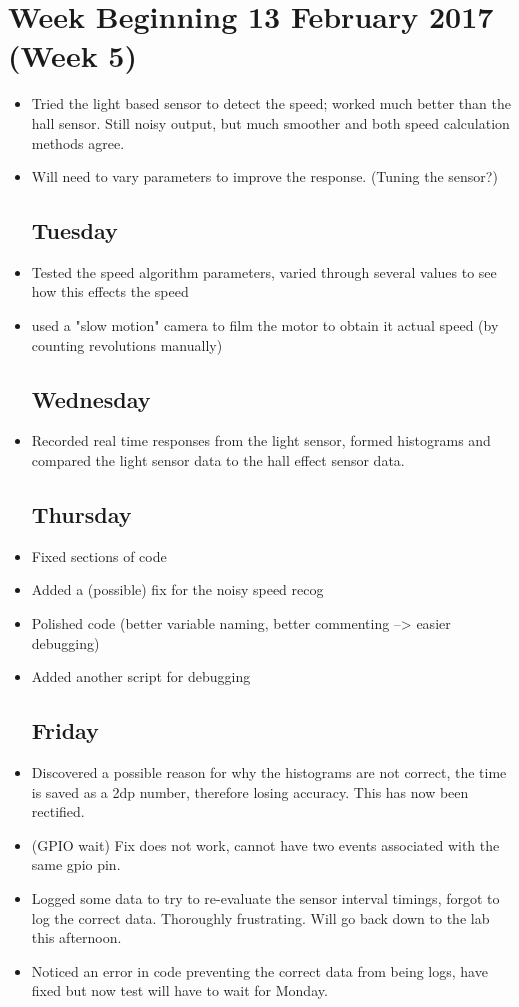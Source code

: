 \documentclass[a4]{report}
\begin{document}
	\section{Week Beginning 13 February 2017 (Week 5)}
	\begin{itemize}
		\subsection*{Monday}
		\item Tried the light based sensor to detect the speed; worked much better than the hall sensor. Still noisy output, but much smoother and both speed calculation methods agree. 
		\item Will need to vary parameters to improve the response. (Tuning the sensor?)
		\subsection*{Tuesday}
		\item Tested the speed algorithm parameters, varied through several values to see how this effects the speed
		\item used a "slow motion" camera to film the motor to obtain it actual speed (by counting revolutions manually)
		\subsection*{Wednesday}
		\item Recorded real time responses from the light sensor, formed histograms and compared the light sensor data to the hall effect sensor data.
		\subsection*{Thursday}
		\item Fixed sections of code
		\item Added a (possible) fix for the noisy speed recog
		\item Polished code (better variable naming, better commenting --> easier debugging)
		\item Added another script for debugging
		\subsection*{Friday}
		\item Discovered a possible reason for why the histograms are not correct, the time is saved as a 2dp number, therefore losing accuracy. This has now been rectified.
		\item (GPIO wait) Fix does not work, cannot have two events associated with the same gpio pin.
		\item Logged some data to try to re-evaluate the sensor interval timings, forgot to log the correct data. Thoroughly frustrating. Will go back down to the lab this afternoon.
		\item Noticed an error in code preventing the correct data from being logs, have fixed but now test will have to wait for Monday.
	\end{itemize}
	\newpage
\end{document}

